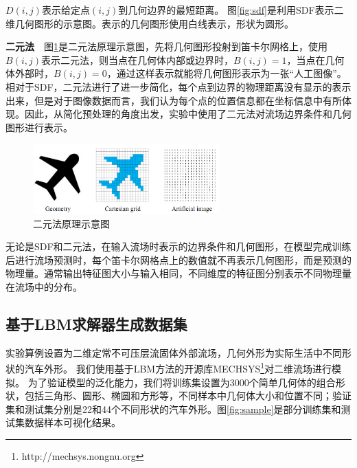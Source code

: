 $D(i, j)$表示给定点$(i, j)$到几何边界的最短距离。
图\ref{fig:sdf}是利用SDF表示二维几何图形的示意图。表示的几何图形使用白线表示，形状为圆形。


\textbf{二元法}~~图\ref{fig:binary}是二元法原理示意图，先将几何图形投射到笛卡尔网格上，使用$B(i, j)$表示二元法，则当点在几何体内部或边界时，$B(i, j) = 1$，当点在几何体外部时，$B(i, j) = 0$，通过这样表示就能将几何图形表示为一张“人工图像”。
相对于SDF，二元法进行了进一步简化，每个点到边界的物理距离没有显示的表示出来，但是对于图像数据而言，我们认为每个点的位置信息都在坐标信息中有所体现。因此，从简化预处理的角度出发，实验中使用了二元法对流场边界条件和几何图形进行表示。

\begin{figure}[htp]
	\centering
	\includegraphics[width=0.64\textwidth]{figures/binary.png}
	\caption{二元法原理示意图}
	\label{fig:binary}
\end{figure}


无论是SDF和二元法，在输入流场时表示的边界条件和几何图形，在模型完成训练后进行流场预测时，每个笛卡尔网格点上的数值就不再表示几何图形，而是预测的物理量。通常输出特征图大小与输入相同，不同维度的特征图分别表示不同物理量在流场中的分布。


\subsection{基于LBM求解器生成数据集}
实验算例设置为二维定常不可压层流固体外部流场，几何外形为实际生活中不同形状的汽车外形。
我们使用基于LBM方法的开源库MECHSYS\footnote{ http://mechsys.nongnu.org}对二维流场进行模拟。
为了验证模型的泛化能力，我们将训练集设置为3000个简单几何体的组合形状，包括三角形、圆形、椭圆和方形等，不同样本中几何体大小和位置不同；验证集和测试集分别是22和44个不同形状的汽车外形。图\ref{fig:sample}是部分训练集和测试集数据样本可视化结果。

